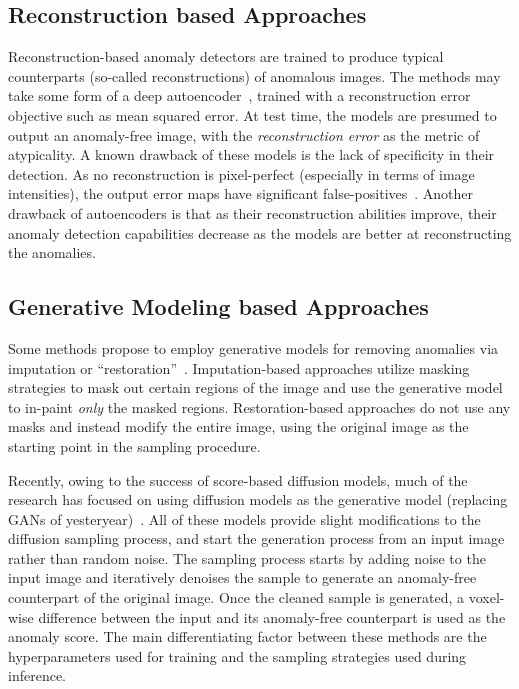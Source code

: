 \subsection*{Reconstruction based Approaches}
Reconstruction-based anomaly detectors are trained to produce typical counterparts (so-called reconstructions) of anomalous images. The methods may take some form of a deep autoencoder~\cite{dae-kascenas22a,baur2021}, trained with a reconstruction error objective such as mean squared error. At test time, the models are presumed to output an anomaly-free image, with the \textit{reconstruction error} as the metric of atypicality. A known drawback of these models is the lack of specificity in their detection. As no reconstruction is pixel-perfect (especially in terms of image intensities), the output error maps have significant false-positives~\cite{baur2021}. Another drawback of autoencoders is that as their reconstruction abilities improve, their anomaly detection capabilities decrease as the models are better at reconstructing the anomalies.

\subsection*{Generative Modeling based Approaches}
Some methods propose to employ generative models for removing anomalies via imputation or ``restoration''~\cite{schlegl2019f,pmlr-v102-you19a}. Imputation-based approaches utilize masking strategies to mask out certain regions of the image and use the generative model to in-paint \textit{only} the masked regions. Restoration-based approaches do not use any masks and instead modify the entire image, using the original image as the starting point in the sampling procedure.

Recently, owing to the success of score-based diffusion models, much of the research has focused on using diffusion models as the generative model (replacing GANs of yesteryear)~\cite{wyattAnoddpmAnomalyDetection2022,pinaya2022fast,liuUnsupervisedOutofDistributionDetection2023,behrendtPatchedDiffusionModels2023}. All of these models provide slight modifications to the diffusion sampling process, and start the generation process from an input image rather than random noise. The sampling process starts by adding noise to the input image and iteratively denoises the sample to generate an anomaly-free counterpart of the original image. Once the cleaned sample is generated, a voxel-wise difference between the input and its anomaly-free counterpart is used as the anomaly score. The main differentiating factor between these methods are the hyperparameters used for training and the sampling strategies used during inference. 

